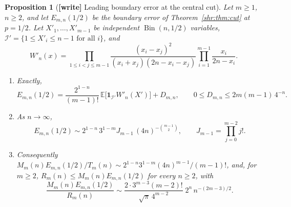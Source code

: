 \documentclass[11pt,letterpaper]{article}
\numberwithin{equation}{section}
\newtheorem{proposition}[theorem]{Proposition}
\theoremstyle{definition}
\newcommand{\E}{\mathbb E}
\newcommand{\1}{\mathbf 1}
\newcommand{\ind}{\mathbf 1}
\begin{document}
\begin{proposition}[\textbf{[write]} Leading boundary error at the central cut]
\label{shr:bp:prop:boundary}
Let $m\ge1$, $n\ge2$, and let $E_{m,n}(1/2)$ be the boundary error of
Theorem~\ref{shr:thm:cut} at $p=1/2$. Let $X'_1,\ldots,X'_{m-1}$ be
independent $\operatorname{Bin}(n,1/2)$ variables,
$\mathcal I'=\{1\le X'_i\le n-1\text{ for all }i\}$, and
\[
 W'_n(x)=\prod_{1\le i<j\le m-1}
 \frac{(x_i-x_j)^2}{(x_i+x_j)(2n-x_i-x_j)}
 \prod_{i=1}^{m-1}\frac{x_i}{2n-x_i}.
\]
\begin{enumerate}[label=(\alph*)]
\item Exactly,
\begin{equation}
 E_{m,n}(1/2)=\frac{2^{1-n}}{(m-1)!}\,
 \E\bigl[\ind_{\mathcal I'}W'_n(X')\bigr]+D_{m,n},
 \qquad 0\le D_{m,n}\le 2m(m-1)\,4^{-n}.
 \label{shr:bp:eq:boundary-exact}
\end{equation}
\item As $n\to\infty$,
\begin{equation}
 E_{m,n}(1/2)\sim 2^{1-n}\,3^{1-m}J_{m-1}\,(4n)^{-\binom{m-1}2},
 \qquad J_{m-1}=\prod_{j=0}^{m-2}j!.
 \label{shr:bp:eq:boundary-lead}
\end{equation}
\item Consequently
$M_m(n)E_{m,n}(1/2)/T_m(n)\sim2^{1-n}3^{1-m}(4n)^{m-1}/(m-1)!$, and, for
$m\ge2$, $R_m(n)\le M_m(n)E_{m,n}(1/2)$ for every $n\ge2$, with
\[
 \frac{M_m(n)E_{m,n}(1/2)}{R_m(n)}\sim
 \frac{2\cdot3^{m-3}(m-2)!}{\sqrt\pi\,4^{m-2}}\;2^n\,n^{-(2m-3)/2}.
\]
\end{enumerate}
\end{proposition}
\end{document}
